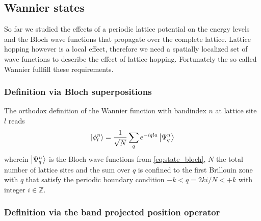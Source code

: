 \subsection{Wannier states}

So far we studied the effects of a periodic lattice potential on the energy
levels and the Bloch wave functions that propagate over the complete lattice.
Lattice hopping however is a local effect, therefore we need a spatially
localized set of wave functions to describe the effect of lattice hopping.
Fortunately the so called Wannier fullfill these requirements.

\subsubsection{Definition via Bloch superpositions}

The orthodox definition of the Wannier function with bandindex $n$ at lattice
site $l$ reads
\begin{equation}
  \ket{\phi^n_{l}}
  =\frac{1}{\sqrt{N}}\sum_qe^{-iqla}\ket{\Psi^n_{q}}
  \label{eq:state_wannier_orthodox}
\end{equation}
wherein $\ket{\Psi^n_q}$ is the Bloch wave functions from
\cref{eq:state_bloch}, $N$ the total number of lattice sites and the sum
over $q$ is confined to the first Brillouin zone with $q$ that satisfy the
periodic boundary condition $-k<q=2ki/N<+k$ with integer $i\in\mathbb{Z}$.

\subsubsection{Definition via the band projected position operator}

